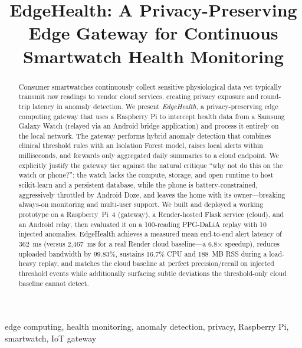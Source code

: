 \documentclass[conference]{IEEEtran}
\begin{document}
\title{EdgeHealth: A Privacy-Preserving Edge Gateway for Continuous Smartwatch Health Monitoring}

\author{
}

\maketitle

\begin{abstract}
Consumer smartwatches continuously collect sensitive physiological data yet typically transmit raw readings to vendor cloud services, creating privacy exposure and round-trip latency in anomaly detection. We present \textit{EdgeHealth}, a privacy-preserving edge computing gateway that uses a Raspberry Pi to intercept health data from a Samsung Galaxy Watch (relayed via an Android bridge application) and process it entirely on the local network. The gateway performs hybrid anomaly detection that combines clinical threshold rules with an Isolation Forest model, raises local alerts within milliseconds, and forwards only aggregated daily summaries to a cloud endpoint. We explicitly justify the gateway tier against the natural critique ``why not do this on the watch or phone?'': the watch lacks the compute, storage, and open runtime to host scikit-learn and a persistent database, while the phone is battery-constrained, aggressively throttled by Android Doze, and leaves the home with its owner---breaking always-on monitoring and multi-user support. We built and deployed a working prototype on a Raspberry~Pi~4 (gateway), a Render-hosted Flask service (cloud), and an Android relay, then evaluated it on a 100-reading PPG-DaLiA replay with 10 injected anomalies. EdgeHealth achieves a measured mean end-to-end alert latency of 362~ms (versus 2{,}467~ms for a real Render cloud baseline---a 6.8$\times$ speedup), reduces uploaded bandwidth by 99.83\%, sustains 16.7\% CPU and 188~MB RSS during a load-heavy replay, and matches the cloud baseline at perfect precision/recall on injected threshold events while additionally surfacing subtle deviations the threshold-only cloud baseline cannot detect.
\end{abstract}

\begin{IEEEkeywords}
edge computing, health monitoring, anomaly detection, privacy, Raspberry Pi, smartwatch, IoT gateway
\end{IEEEkeywords}
\end{document}
